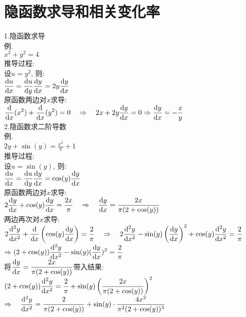 \chapter{隐函数求导和相关变化率}
1.隐函数求导\\
例.\\
$x^2+y^2=4$\\[2ex]
推导过程:\\
设$u=y^2$, 则:\\
$\displaystyle\frac{\dif u}{\dif x}=\frac{\dif u}{\dif y}\frac{\dif y}{\dif x}=2y\frac{\dif y}{\dif x}$\\
原函数两边对$x$求导:\\[1ex]
$\displaystyle\frac{\dif }{\dif x}(x^2)+\frac{\dif }{\dif x}(y^2)=0\quad\Rightarrow\quad 2x+2y\frac{\dif y}{\dif x}=0\Rightarrow\frac{\dif y}{\dif x}=-\frac{x}{y}$\\[2ex]

2.隐函数求二阶导数\\
例.\\
$\displaystyle 2y+\sin(y)=\frac{x^2}{\pi}+1$\\[2ex]
推导过程:\\
设$u=\sin(y)$, 则:\\
$\displaystyle\frac{\dif u}{\dif x}=\frac{\dif u}{\dif y}\frac{\dif y}{\dif x}=\cos(y)\frac{\dif y}{\dif x}$\\
原函数两边对$x$求导:\\[1ex]
$\displaystyle 2\frac{\mathop{}\!\mathrm{d} y}{\mathop{}\!\mathrm{d} x}+\cos(y)\frac{\mathop{}\!\mathrm{d} y}{\mathop{}\!\mathrm{d} x}=\frac{2x}{\pi}\quad\Rightarrow\quad\frac{\mathop{}\!\mathrm{d} y}{\mathop{}\!\mathrm{d} x}=\frac{2x}{\pi(2+\cos(y))}$\\[1ex]
两边再次对$x$求导:\\[1ex]
$\displaystyle 2\frac{\dif ^2y}{\dif x^2}+\frac{\dif }{\dif x}\left(\cos(y)\frac{\dif y}{\dif x}\right)=\frac{2}{\pi}\quad\Rightarrow\quad 2\frac{\dif ^2y}{\dif x^2}-\sin(y)\left(\frac{\dif y}{\dif x}\right)^2+\cos(y)\frac{\dif ^2y}{\dif x^2}=\frac{2}{\pi}$\\
$\Rightarrow\displaystyle (2+\cos(y))\frac{\mathop{}\!\mathrm{d} ^2y}{\mathop{}\!\mathrm{d} x^2}-\sin(y)(\frac{\mathop{}\!\mathrm{d} y}{\mathop{}\!\mathrm{d} x})^2=\frac{2}{\pi}$\\[1ex]
将$\displaystyle\frac{\mathop{}\!\mathrm{d} y}{\mathop{}\!\mathrm{d} x}=\frac{2x}{\pi(2+\cos(y))}$带入结果:\\[1ex]
$\displaystyle (2+\cos(y))\frac{\mathop{}\!\mathrm{d} ^2y}{\mathop{}\!\mathrm{d} x^2}=\frac{2}{\pi}+\sin(y)\left(\frac{2x}{\pi(2+\cos(y))}\right)^2$\\
$\displaystyle\Rightarrow\quad\frac{\mathop{}\!\mathrm{d} ^2y}{\mathop{}\!\mathrm{d} x^2}=\frac{2}{\pi(2+\cos(y))}+\sin(y)\cdot\frac{4x^2}{\pi^2(2+\cos(y))^3}$\\[2ex]

